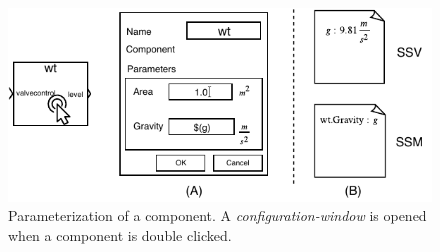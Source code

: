 \begin{figure}[bt]
\centering
\includegraphics[width=0.8\columnwidth]{Images/parameterization.pdf}
\caption{Parameterization of a component. A \emph{configuration-window} is opened when a component is double clicked.}
\label{fig:parameterization}
\end{figure}
